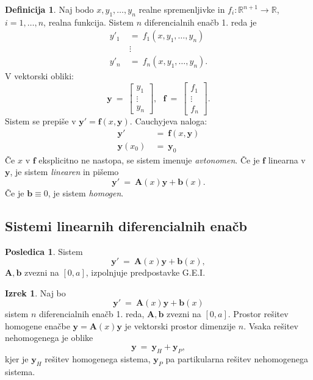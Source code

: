 \documentclass[11pt]{article}
\newcommand{\R}{\mathbb{R}}
\renewcommand{\b}{\mathbf{b}}
\newcommand{\f}{\mathbf{f}}
\newcommand{\y}{\mathbf{y}}
\newcommand{\A}{\mathbf{A}}
\theoremstyle{definition}
\newtheorem{definicija}{Definicija}[section]
\theoremstyle{definition}
\theoremstyle{definition}
\newtheorem{izrek}{Izrek}[section]
\theoremstyle{definition}
\newtheorem*{posledica}{Posledica}
\begin{document}
\begin{definicija}

Naj bodo $x,y_1,\ldots,y_n$ realne spremenljivke in $f_i: \R^{n+1} \rightarrow \R$, $i = 1,\ldots,n$, realna funkcija. Sistem $n$ diferencialnih enačb 1. reda je
\begin{align*}
y'_1 ~&=~ f_1(x,y_1,\ldots,y_n) \\
&\vdots \\
y'_n ~&=~ f_n(x,y_1,\ldots,y_n).
\end{align*}
V vektorski obliki:
$$\y ~=~ \begin{bmatrix}
y_1 \\
\vdots \\
y_n
\end{bmatrix}, ~~~\f ~=~ \begin{bmatrix}
f_1 \\
\vdots \\
f_n
\end{bmatrix}.$$
Sistem se prepiše v $\y' = \f(x,\y)$. Cauchyjeva naloga:
\begin{align*}
\y' ~&=~ \f(x,\y) \\
\y(x_0) ~&=~ \y_0
\end{align*}
Če $x$ v $\f$ eksplicitno ne nastopa, se sistem imenuje \textit{avtonomen}. Če je $\f$ linearna v $\y$, je sistem \textit{linearen} in pišemo
$$\y' ~=~ \A(x)\y + \b(x).$$
Če je $\b \equiv 0$, je sistem \textit{homogen}. 

\end{definicija}
\vspace{0.5cm}


\subsection{Sistemi linearnih diferencialnih enačb}
\vspace{0.5cm}

\begin{posledica}

Sistem
$$\y' ~=~ \A(x)\y + \b(x),$$
$\A,\b$ zvezni na $[0,a]$, izpolnjuje predpostavke G.E.I.

\end{posledica}
\vspace{0.5cm}

\begin{izrek}

Naj bo 
$$\y' ~=~ \A(x)\y + \b(x)$$
sistem $n$ diferencialnih enačb 1. reda, $\A,\b$ zvezni na $[0,a]$. Prostor rešitev homogene enačbe $\y = \A(x)\y$ je vektorski prostor dimenzije $n$. Vsaka rešitev nehomogenega je oblike
$$\y ~=~ \y_H + \y_P,$$
kjer je $\y_H$ rešitev homogenega sistema, $\y_P$ pa partikularna rešitev nehomogenega sistema.

\end{izrek}
\vspace{0.5cm}


\pagebreak

\end{document}
